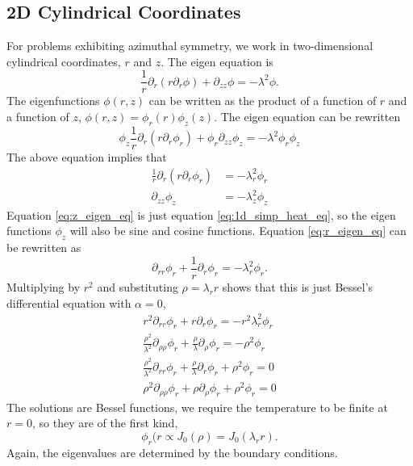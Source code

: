 \documentclass[letterpaper,12pt]{article}
\begin{document}
\subsection{2D Cylindrical Coordinates}
For problems exhibiting azimuthal symmetry, we work in two-dimensional cylindrical coordinates, $r$ and $z$. The eigen
equation is
\begin{equation}
  \frac{1}{r} \partial_r (r \partial_r \phi) + \partial_{zz} \phi = -\lambda^2 \phi.
\end{equation}
The eigenfunctions $\phi(r,z)$ can be written as the product of a function of $r$ and a function of $z$, $\phi(r,z) = \phi_r(r) \phi_z(z)$.
The eigen equation can be rewritten
\begin{equation}
  \phi_z \frac{1}{r} \partial_r (r \partial_r \phi_r) + \phi_r \partial_{zz} \phi_z =
  -\lambda^2 \phi_r\phi_z
\end{equation}
The above equation implies that
\begin{align}
 \label{eq:r_eigen_eq}
 \frac{1}{r} \partial_r (r \partial_r \phi_r)&= -\lambda_r^2 \phi_r \\
 \label{eq:z_eigen_eq}
                        \partial_{zz} \phi_z &= -\lambda_z^2 \phi_z
\end{align}
Equation \ref{eq:z_eigen_eq} is just equation \ref{eq:1d_simp_heat_eq}, so the eigen functions $\phi_z$ will also be sine and
cosine functions. Equation \ref{eq:r_eigen_eq} can be rewritten as
\begin{equation}
 \partial_{rr} \phi_r + \frac{1}{r} \partial_r \phi_r = -\lambda_r^2 \phi_r.
\end{equation}
Multiplying by $r^2$ and substituting $\rho  = \lambda_r r$ shows that this is just Bessel's differential equation with $\alpha = 0$,
\begin{align}
 r^2\partial_{rr} \phi_r + r \partial_r \phi_r = -r^2 \lambda_r^2 \phi_r \\
 \frac{\rho^2}{\lambda^2} \partial_{\rho\rho} \phi_r + \frac{\rho}{\lambda} \partial_\rho \phi_r = -\rho^2 \phi_r \\
 \frac{\rho^2}{\lambda^2} \partial_{ r   r  } \phi_r + \frac{\rho}{\lambda} \partial_r    \phi_r + \rho^2 \phi_r = 0 \\
       \rho^2             \partial_{\rho\rho} \phi_r +       \rho           \partial_\rho \phi_r + \rho^2 \phi_r = 0
\end{align}
The solutions are Bessel functions, we require the temperature to be finite at $r=0$, so they are of the first kind,
\begin{equation}
 \phi_r(r \propto J_0(\rho) = J_0(\lambda_r r).
\end{equation}
Again, the eigenvalues are determined by the boundary conditions.
\end{document}
